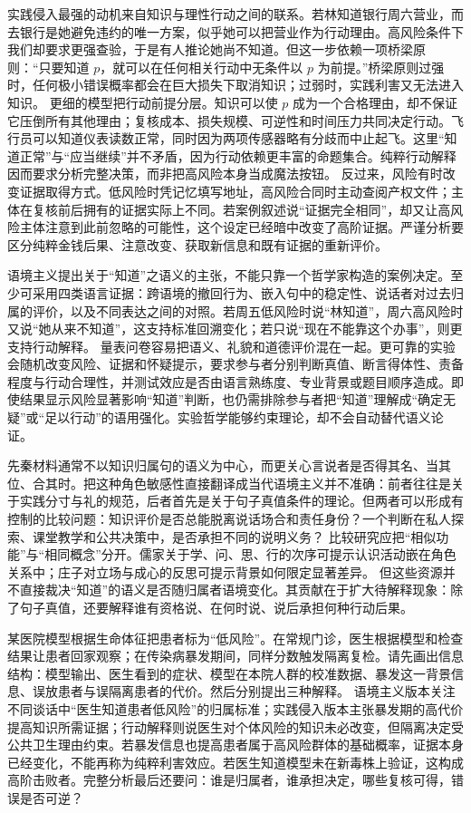 实践侵入最强的动机来自知识与理性行动之间的联系。若林知道银行周六营业，而去银行是她避免违约的唯一方案，似乎她可以把营业作为行动理由。高风险条件下我们却要求更强查验，于是有人推论她尚不知道。但这一步依赖一项桥梁原则：“只要知道 \(p\)，就可以在任何相关行动中无条件以 \(p\) 为前提。”桥梁原则过强时，任何极小错误概率都会在巨大损失下取消知识；过弱时，实践利害又无法进入知识。 更细的模型把行动前提分层。知识可以使 \(p\) 成为一个合格理由，却不保证它压倒所有其他理由；复核成本、损失规模、可逆性和时间压力共同决定行动。飞行员可以知道仪表读数正常，同时因为两项传感器略有分歧而中止起飞。这里“知道正常”与“应当继续”并不矛盾，因为行动依赖更丰富的命题集合。纯粹行动解释因而要求分析完整决策，而非把高风险本身当成魔法按钮。 反过来，风险有时改变证据取得方式。低风险时凭记忆填写地址，高风险合同时主动查阅产权文件；主体在复核前后拥有的证据实际上不同。若案例叙述说“证据完全相同”，却又让高风险主体注意到此前忽略的可能性，这个设定已经暗中改变了高阶证据。严谨分析要区分纯粹金钱后果、注意改变、获取新信息和既有证据的重新评价。

语境主义提出关于“知道”之语义的主张，不能只靠一个哲学家构造的案例决定。至少可采用四类语言证据：跨语境的撤回行为、嵌入句中的稳定性、说话者对过去归属的评价，以及不同表达之间的对照。若周五低风险时说“林知道”，周六高风险时又说“她从来不知道”，这支持标准回溯变化；若只说“现在不能靠这个办事”，则更支持行动解释。 量表问卷容易把语义、礼貌和道德评价混在一起。更可靠的实验会随机改变风险、证据和怀疑提示，要求参与者分别判断真值、断言得体性、责备程度与行动合理性，并测试效应是否由语言熟练度、专业背景或题目顺序造成。即使结果显示风险显著影响“知道”判断，也仍需排除参与者把“知道”理解成“确定无疑”或“足以行动”的语用强化。实验哲学能够约束理论，却不会自动替代语义论证。

先秦材料通常不以知识归属句的语义为中心，而更关心言说者是否得其名、当其位、合其时。把这种角色敏感性直接翻译成当代语境主义并不准确：前者往往是关于实践分寸与礼的规范，后者首先是关于句子真值条件的理论。但两者可以形成有控制的比较问题：知识评价是否总能脱离说话场合和责任身份？一个判断在私人探索、课堂教学和公共决策中，是否承担不同的说明义务？ 比较研究应把“相似功能”与“相同概念”分开。儒家关于学、问、思、行的次序可提示认识活动嵌在角色关系中；庄子对立场与成心的反思可提示背景如何限定显著差异。\parencite{analects2003,zhuangzi2009} 但这些资源并不直接裁决“知道”的语义是否随归属者语境变化。其贡献在于扩大待解释现象：除了句子真值，还要解释谁有资格说、在何时说、说后承担何种行动后果。

某医院模型根据生命体征把患者标为“低风险”。在常规门诊，医生根据模型和检查结果让患者回家观察；在传染病暴发期间，同样分数触发隔离复检。请先画出信息结构：模型输出、医生看到的症状、模型在本院人群的校准数据、暴发这一背景信息、误放患者与误隔离患者的代价。然后分别提出三种解释。 语境主义版本关注不同谈话中“医生知道患者低风险”的归属标准；实践侵入版本主张暴发期的高代价提高知识所需证据；行动解释则说医生对个体风险的知识未必改变，但隔离决定受公共卫生理由约束。若暴发信息也提高患者属于高风险群体的基础概率，证据本身已经变化，不能再称为纯粹利害效应。若医生知道模型未在新毒株上验证，这构成高阶击败者。完整分析最后还要问：谁是归属者，谁承担决定，哪些复核可得，错误是否可逆？

